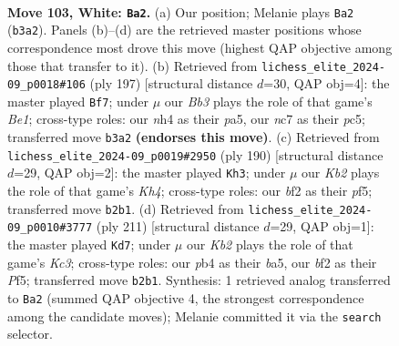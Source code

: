 \documentclass[11pt]{article}
\begin{document}
\clearpage

\begin{figure}[p]\centering
\begin{subfigure}{0.46\textwidth}\centering
\resizebox{\linewidth}{!}{%
\newchessgame
\chessboard[
  setfen={5k2/1Nn5/8/8/Pp2P2n/1B6/1K2pb1p/8 w - - 2 103},
  showmover=false,
  pgfstyle=straightmove, color=movearrow, markmove={b3-a2}
]}
\caption{}
\end{subfigure}\hfill
\begin{subfigure}{0.46\textwidth}\centering
\resizebox{\linewidth}{!}{%
\newchessgame
\chessboard[
  setfen={4b3/p3k3/2p5/P1P1PBK1/8/8/8/8 b - - 14 99},
  showmover=false,
  pgfstyle=straightmove, color=movearrow, markmove={e8-f7}
]}
\caption{}
\end{subfigure}
\\[4pt]
\begin{subfigure}{0.46\textwidth}\centering
\resizebox{\linewidth}{!}{%
\newchessgame
\chessboard[
  setfen={8/6k1/7p/5p2/2P1nP1K/1n2B3/8/8 w - - 2 96},
  showmover=false,
  pgfstyle=straightmove, color=movearrow, markmove={h4-h3}
]}
\caption{}
\end{subfigure}\hfill
\begin{subfigure}{0.46\textwidth}\centering
\resizebox{\linewidth}{!}{%
\newchessgame
\chessboard[
  setfen={8/8/2k5/B4p1p/p2K1P1P/P7/1P2b3/8 b - - 2 106},
  showmover=false,
  pgfstyle=straightmove, color=movearrow, markmove={c6-d7}
]}
\caption{}
\end{subfigure}
\caption{\textbf{Move 103, White: \texttt{Ba2}.} (a) Our position; Melanie plays \texttt{Ba2} (\texttt{b3a2}). Panels (b)--(d) are the retrieved master positions whose correspondence most drove this move (highest QAP objective among those that transfer to it). (b) Retrieved from \texttt{lichess\_elite\_2024-09\_p0018\#106} (ply 197) [structural distance $d$=30, QAP obj=4]: the master played \texttt{Bf7}; under $\mu$ our \emph{Bb3} plays the role of that game's \emph{Be1}; cross-type roles: our \emph{n}h4 as their \emph{p}a5, our \emph{n}c7 as their \emph{p}c5; transferred move \texttt{b3a2} \textbf{(endorses this move)}. (c) Retrieved from \texttt{lichess\_elite\_2024-09\_p0019\#2950} (ply 190) [structural distance $d$=29, QAP obj=2]: the master played \texttt{Kh3}; under $\mu$ our \emph{Kb2} plays the role of that game's \emph{Kh4}; cross-type roles: our \emph{b}f2 as their \emph{p}f5; transferred move \texttt{b2b1}. (d) Retrieved from \texttt{lichess\_elite\_2024-09\_p0010\#3777} (ply 211) [structural distance $d$=29, QAP obj=1]: the master played \texttt{Kd7}; under $\mu$ our \emph{Kb2} plays the role of that game's \emph{Kc3}; cross-type roles: our \emph{p}b4 as their \emph{b}a5, our \emph{b}f2 as their \emph{P}f5; transferred move \texttt{b2b1}. Synthesis: 1 retrieved analog transferred to \texttt{Ba2} (summed QAP objective 4, the strongest correspondence among the candidate moves); Melanie committed it via the \texttt{search} selector.}
\label{fig:thought-m204}
\end{figure}
\end{document}
